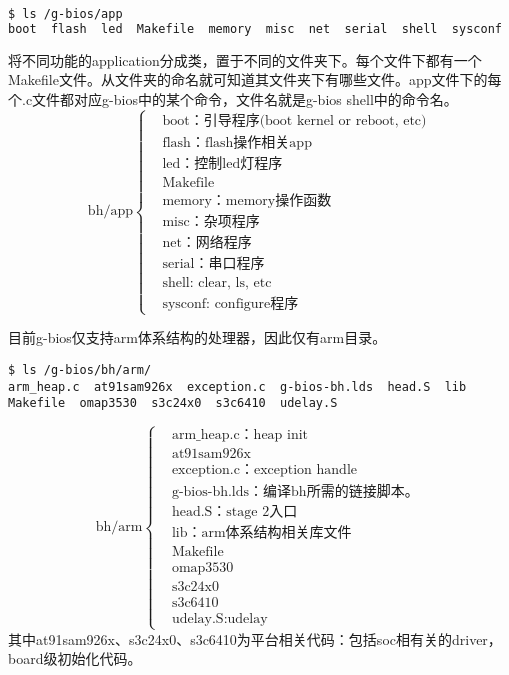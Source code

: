 \begin{lstlisting}[language=bash, numbers=none]
$ ls /g-bios/app
boot  flash  led  Makefile  memory  misc  net  serial  shell  sysconf
\end{lstlisting}
将不同功能的application分成类，置于不同的文件夹下。每个文件下都有一个Makefile文件。从文件夹的命名就可知道其文件夹下有哪些文件。app文件下的每个.c文件都对应g-bios中的某个命令，文件名就是g-bios shell中的命令名。
\begin{equation*}
\text{bh/app}
\left\{
	\begin{aligned}
	&\text{boot：引导程序(boot kernel or reboot, etc)} \\
	&\text{flash：flash操作相关app} \\
	&\text{led：控制led灯程序} \\
	&\text{Makefile} \\
	&\text{memory：memory操作函数} \\
	&\text{misc：杂项程序} \\
	&\text{net：网络程序} \\
	&\text{serial：串口程序} \\
	&\text{shell: clear, ls, etc} \\
	&\text{sysconf: configure程序}
	\end{aligned}
\right.
\end{equation*}

目前g-bios仅支持arm体系结构的处理器，因此仅有arm目录。
\begin{lstlisting}[language={SH},numbers=none]
$ ls /g-bios/bh/arm/
arm_heap.c  at91sam926x  exception.c  g-bios-bh.lds  head.S  lib  Makefile  omap3530  s3c24x0  s3c6410  udelay.S
\end{lstlisting}

\begin{equation*}
\text{bh/arm}
\left\{
	\begin{aligned}
	&\text{arm\_heap.c：heap init} \\
	&\text{at91sam926x} \\
	&\text{exception.c：exception handle} \\
	&\text{g-bios-bh.lds：编译bh所需的链接脚本。} \\
	&\text{head.S：stage 2入口} \\
	&\text{lib：arm体系结构相关库文件} \\
	&\text{Makefile}\\
	&\text{omap3530}\\
	&\text{s3c24x0}\\
	&\text{s3c6410}\\
	&\text{udelay.S:udelay}
	\end{aligned}
\right.
\end{equation*}
其中at91sam926x、s3c24x0、s3c6410为平台相关代码：包括soc相有关的driver，board级初始化代码。

